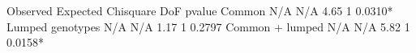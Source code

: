 \documentclass[letterpaper,10pt,english,openany,oneside]{sphinxmanual}
\begin{document}
\begin{sphinxVerbatim}[commandchars=\\\{\}]
                      Observed    Expected  Chi\PYGZhy{}square   DoF   p\PYGZhy{}value
\PYGZhy{}\PYGZhy{}\PYGZhy{}\PYGZhy{}\PYGZhy{}\PYGZhy{}\PYGZhy{}\PYGZhy{}\PYGZhy{}\PYGZhy{}\PYGZhy{}\PYGZhy{}\PYGZhy{}\PYGZhy{}\PYGZhy{}\PYGZhy{}\PYGZhy{}\PYGZhy{}\PYGZhy{}\PYGZhy{}\PYGZhy{}\PYGZhy{}\PYGZhy{}\PYGZhy{}\PYGZhy{}\PYGZhy{}\PYGZhy{}\PYGZhy{}\PYGZhy{}\PYGZhy{}\PYGZhy{}\PYGZhy{}\PYGZhy{}\PYGZhy{}\PYGZhy{}\PYGZhy{}\PYGZhy{}\PYGZhy{}\PYGZhy{}\PYGZhy{}\PYGZhy{}\PYGZhy{}\PYGZhy{}\PYGZhy{}\PYGZhy{}\PYGZhy{}\PYGZhy{}\PYGZhy{}\PYGZhy{}\PYGZhy{}\PYGZhy{}\PYGZhy{}\PYGZhy{}\PYGZhy{}\PYGZhy{}\PYGZhy{}\PYGZhy{}\PYGZhy{}\PYGZhy{}\PYGZhy{}\PYGZhy{}\PYGZhy{}\PYGZhy{}\PYGZhy{}\PYGZhy{}\PYGZhy{}\PYGZhy{}\PYGZhy{}\PYGZhy{}\PYGZhy{}\PYGZhy{}\PYGZhy{}\PYGZhy{}\PYGZhy{}\PYGZhy{}\PYGZhy{}\PYGZhy{}\PYGZhy{}
            Common         N/A         N/A        4.65     1  0.0310*
\PYGZhy{}\PYGZhy{}\PYGZhy{}\PYGZhy{}\PYGZhy{}\PYGZhy{}\PYGZhy{}\PYGZhy{}\PYGZhy{}\PYGZhy{}\PYGZhy{}\PYGZhy{}\PYGZhy{}\PYGZhy{}\PYGZhy{}\PYGZhy{}\PYGZhy{}\PYGZhy{}\PYGZhy{}\PYGZhy{}\PYGZhy{}\PYGZhy{}\PYGZhy{}\PYGZhy{}\PYGZhy{}\PYGZhy{}\PYGZhy{}\PYGZhy{}\PYGZhy{}\PYGZhy{}\PYGZhy{}\PYGZhy{}\PYGZhy{}\PYGZhy{}\PYGZhy{}\PYGZhy{}\PYGZhy{}\PYGZhy{}\PYGZhy{}\PYGZhy{}\PYGZhy{}\PYGZhy{}\PYGZhy{}\PYGZhy{}\PYGZhy{}\PYGZhy{}\PYGZhy{}\PYGZhy{}\PYGZhy{}\PYGZhy{}\PYGZhy{}\PYGZhy{}\PYGZhy{}\PYGZhy{}\PYGZhy{}\PYGZhy{}\PYGZhy{}\PYGZhy{}\PYGZhy{}\PYGZhy{}\PYGZhy{}\PYGZhy{}\PYGZhy{}\PYGZhy{}\PYGZhy{}\PYGZhy{}\PYGZhy{}\PYGZhy{}\PYGZhy{}\PYGZhy{}\PYGZhy{}\PYGZhy{}\PYGZhy{}\PYGZhy{}\PYGZhy{}\PYGZhy{}\PYGZhy{}\PYGZhy{}
  Lumped genotypes         N/A         N/A        1.17     1  0.2797
\PYGZhy{}\PYGZhy{}\PYGZhy{}\PYGZhy{}\PYGZhy{}\PYGZhy{}\PYGZhy{}\PYGZhy{}\PYGZhy{}\PYGZhy{}\PYGZhy{}\PYGZhy{}\PYGZhy{}\PYGZhy{}\PYGZhy{}\PYGZhy{}\PYGZhy{}\PYGZhy{}\PYGZhy{}\PYGZhy{}\PYGZhy{}\PYGZhy{}\PYGZhy{}\PYGZhy{}\PYGZhy{}\PYGZhy{}\PYGZhy{}\PYGZhy{}\PYGZhy{}\PYGZhy{}\PYGZhy{}\PYGZhy{}\PYGZhy{}\PYGZhy{}\PYGZhy{}\PYGZhy{}\PYGZhy{}\PYGZhy{}\PYGZhy{}\PYGZhy{}\PYGZhy{}\PYGZhy{}\PYGZhy{}\PYGZhy{}\PYGZhy{}\PYGZhy{}\PYGZhy{}\PYGZhy{}\PYGZhy{}\PYGZhy{}\PYGZhy{}\PYGZhy{}\PYGZhy{}\PYGZhy{}\PYGZhy{}\PYGZhy{}\PYGZhy{}\PYGZhy{}\PYGZhy{}\PYGZhy{}\PYGZhy{}\PYGZhy{}\PYGZhy{}\PYGZhy{}\PYGZhy{}\PYGZhy{}\PYGZhy{}\PYGZhy{}\PYGZhy{}\PYGZhy{}\PYGZhy{}\PYGZhy{}\PYGZhy{}\PYGZhy{}\PYGZhy{}\PYGZhy{}\PYGZhy{}\PYGZhy{}
   Common + lumped         N/A         N/A        5.82     1  0.0158*
\PYGZhy{}\PYGZhy{}\PYGZhy{}\PYGZhy{}\PYGZhy{}\PYGZhy{}\PYGZhy{}\PYGZhy{}\PYGZhy{}\PYGZhy{}\PYGZhy{}\PYGZhy{}\PYGZhy{}\PYGZhy{}\PYGZhy{}\PYGZhy{}\PYGZhy{}\PYGZhy{}\PYGZhy{}\PYGZhy{}\PYGZhy{}\PYGZhy{}\PYGZhy{}\PYGZhy{}\PYGZhy{}\PYGZhy{}\PYGZhy{}\PYGZhy{}\PYGZhy{}\PYGZhy{}\PYGZhy{}\PYGZhy{}\PYGZhy{}\PYGZhy{}\PYGZhy{}\PYGZhy{}\PYGZhy{}\PYGZhy{}\PYGZhy{}\PYGZhy{}\PYGZhy{}\PYGZhy{}\PYGZhy{}\PYGZhy{}\PYGZhy{}\PYGZhy{}\PYGZhy{}\PYGZhy{}\PYGZhy{}\PYGZhy{}\PYGZhy{}\PYGZhy{}\PYGZhy{}\PYGZhy{}\PYGZhy{}\PYGZhy{}\PYGZhy{}\PYGZhy{}\PYGZhy{}\PYGZhy{}\PYGZhy{}\PYGZhy{}\PYGZhy{}\PYGZhy{}\PYGZhy{}\PYGZhy{}\PYGZhy{}\PYGZhy{}\PYGZhy{}\PYGZhy{}\PYGZhy{}\PYGZhy{}\PYGZhy{}\PYGZhy{}\PYGZhy{}\PYGZhy{}\PYGZhy{}\PYGZhy{}

\end{sphinxVerbatim}
\end{document}
